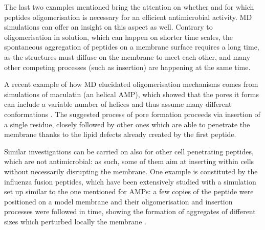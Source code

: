 The last two examples mentioned bring the attention on whether and for which peptides oligomerisation is necessary for an efficient antimicrobial activity. MD simulations can offer an insight on this aspect as well. Contrary to oligomerisation in solution, which can happen on shorter time scales, the spontaneous aggregation of peptides on a membrane surface requires a long time, as the structures must diffuse on the membrane to meet each other, and many other competing processes (such as insertion) are happening at the same time.

A recent example of how MD elucidated oligomerisation mechanisms comes from simulations of maculatin (an helical AMP), which showed that the pores it forms can include a variable number of helices and thus assume many different conformations \cite{Wang2016}. The suggested process of pore formation proceeds via insertion of a single residue, closely followed by other ones which are able to penetrate the membrane thanks to the lipid defects already created by the first peptide.

Similar investigations can be carried on also for other cell penetrating peptides, which are not antimicrobial: as such, some of them aim at inserting within cells without necessarily disrupting the membrane. One example is constituted by the influenza fusion peptides, which have been extensively studied with a simulation set up similar to the one mentioned for AMPs: a few copies of the peptide were positioned on a model membrane and their oligomerisation and insertion processes were followed in time, showing the formation of aggregates of different sizes which perturbed locally the membrane \cite{Haria2014,Collu2015}.

